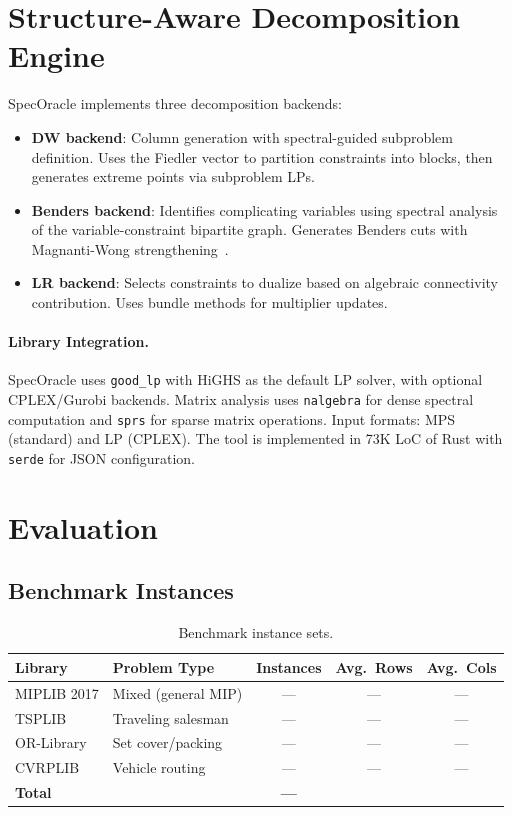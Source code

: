 \documentclass[11pt]{article}
\begin{document}
\section{Structure-Aware Decomposition Engine}
\label{sec:engine}

SpecOracle implements three decomposition backends:

\begin{itemize}
\item \textbf{DW backend}: Column generation with spectral-guided subproblem definition. Uses the Fiedler vector to partition constraints into blocks, then generates extreme points via subproblem LPs.
\item \textbf{Benders backend}: Identifies complicating variables using spectral analysis of the variable-constraint bipartite graph. Generates Benders cuts with Magnanti-Wong strengthening~\cite{magnanti1981}.
\item \textbf{LR backend}: Selects constraints to dualize based on algebraic connectivity contribution. Uses bundle methods for multiplier updates.
\end{itemize}

\paragraph{Library Integration.} SpecOracle uses \texttt{good\_lp} with HiGHS as the default LP solver, with optional CPLEX/Gurobi backends. Matrix analysis uses \texttt{nalgebra} for dense spectral computation and \texttt{sprs} for sparse matrix operations. Input formats: MPS (standard) and LP (CPLEX). The tool is implemented in 73K LoC of Rust with \texttt{serde} for JSON configuration.

\section{Evaluation}
\label{sec:eval}

\subsection{Benchmark Instances}

\begin{table}[t]
\centering
\caption{Benchmark instance sets.}
\begin{tabular}{llccc}
\toprule
\textbf{Library} & \textbf{Problem Type} & \textbf{Instances} & \textbf{Avg.\ Rows} & \textbf{Avg.\ Cols} \\
\midrule
MIPLIB 2017 & Mixed (general MIP) & --- & --- & --- \\
TSPLIB & Traveling salesman & --- & --- & --- \\
OR-Library & Set cover/packing & --- & --- & --- \\
CVRPLIB & Vehicle routing & --- & --- & --- \\
\midrule
\textbf{Total} & & \textbf{---} & & \\
\bottomrule
\end{tabular}
\end{table}
\end{document}
